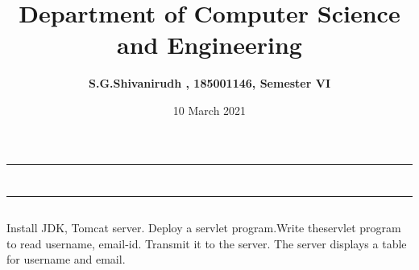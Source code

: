 \documentclass[12pt,letterpaper]{article}
\title{\textbf{Department of Computer Science and Engineering}}
\author{\textbf{S.G.Shivanirudh , 185001146, Semester VI }}
\date{10 March 2021}
\begin{document}
\maketitle
\hrule
\section*{}
\hrule 
\bigskip\bigskip

\subsection*{}

\subsection*{}
\begin{flushleft}
    Install JDK, Tomcat server. Deploy a servlet program.Write theservlet program to read username, email-id.
    Transmit it to the server. The server displays a table for username and email.
\end{flushleft}

\subsection*{}
\subsubsection*{}
\begin{flushleft}

\end{flushleft}

\subsubsection*{}
\begin{flushleft}

\end{flushleft}

\subsubsection*{}
\begin{flushleft}

\end{flushleft}
\end{document}
